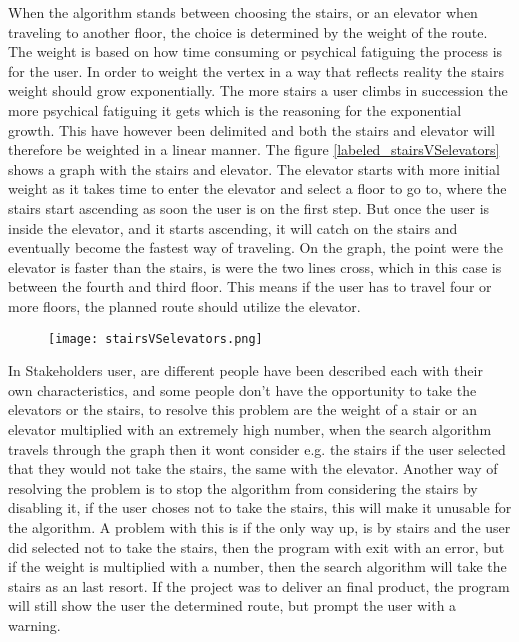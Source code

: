 When the algorithm stands between choosing the stairs, or an elevator when traveling to another floor, the choice is determined by the weight of the route. The weight is based on how time consuming or psychical fatiguing the process is for the user. In order to weight the vertex in a way that reflects reality the stairs weight should grow exponentially. The more stairs a user climbs in succession the more psychical fatiguing it gets which is the reasoning for the exponential growth. This have however been delimited 
 and both the stairs and elevator will therefore be weighted in a linear manner. The figure \cref{labeled_stairsVSelevators} shows a graph with the stairs and elevator. The elevator starts with more initial weight as it takes time to enter the elevator and select a floor to go to, where the stairs start ascending as soon the user is on the first step. But once the user is inside the elevator, and it starts ascending, it will catch on the stairs and eventually become the fastest way of traveling. On the graph, the point were the elevator is faster than the stairs, is were the two lines cross, which in this case is between the fourth and third floor. This means if the user has to travel four or more floors, the planned route should utilize the elevator.

\begin{figure}[ht!]
    \centering
    \texttt{[image: stairsVSelevators.png]}
    \label{fig:labeled_stairsVSelevators}
  \end{figure}


In Stakeholders user, are different people have been described each with their own characteristics, and some people don't have the opportunity to take the elevators or the stairs, to resolve this problem are the weight of a stair or an elevator multiplied with an extremely high number, when the search algorithm travels through the graph then it wont consider e.g. the stairs if the user selected that they would not take the stairs, the same with the elevator. Another way of resolving the problem is to stop the algorithm from considering the stairs by disabling it, if the user choses not to take the stairs, this will make it unusable for the algorithm. A problem with this is if the only way up, is by stairs and the user did selected not to take the stairs, then the program with exit with an error, but if the weight is multiplied with a number, then the search algorithm will take the stairs as an last resort. If the project was to deliver an final product, the program will still show the user the determined route, but prompt the user with a warning.



